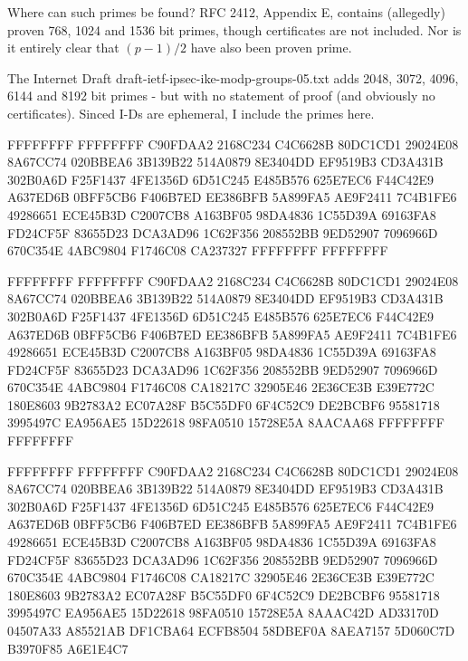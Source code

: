 \documentclass[a4paper,titlepage]{article}
\begin{document}
Where can such primes be found? RFC 2412, Appendix E, contains
(allegedly) proven 768, 1024 and 1536 bit primes, though certificates
are not included. Nor is it entirely clear that $(p-1)/2$ have also
been proven prime.

The Internet Draft draft-ietf-ipsec-ike-modp-groups-05.txt adds 2048,
3072, 4096, 6144 and 8192 bit primes - but with no statement of proof
(and obviously no certificates). Sinced I-Ds are ephemeral, I include
the primes here.


\begin{tt}
	FFFFFFFF FFFFFFFF C90FDAA2 2168C234 C4C6628B 80DC1CD1
	29024E08 8A67CC74 020BBEA6 3B139B22 514A0879 8E3404DD
	EF9519B3 CD3A431B 302B0A6D F25F1437 4FE1356D 6D51C245
	E485B576 625E7EC6 F44C42E9 A637ED6B 0BFF5CB6 F406B7ED
	EE386BFB 5A899FA5 AE9F2411 7C4B1FE6 49286651 ECE45B3D
	C2007CB8 A163BF05 98DA4836 1C55D39A 69163FA8 FD24CF5F
	83655D23 DCA3AD96 1C62F356 208552BB 9ED52907 7096966D
	670C354E 4ABC9804 F1746C08 CA237327 FFFFFFFF FFFFFFFF
\end{tt}


\begin{tt}
        FFFFFFFF FFFFFFFF C90FDAA2 2168C234 C4C6628B 80DC1CD1
        29024E08 8A67CC74 020BBEA6 3B139B22 514A0879 8E3404DD
        EF9519B3 CD3A431B 302B0A6D F25F1437 4FE1356D 6D51C245
        E485B576 625E7EC6 F44C42E9 A637ED6B 0BFF5CB6 F406B7ED
        EE386BFB 5A899FA5 AE9F2411 7C4B1FE6 49286651 ECE45B3D
        C2007CB8 A163BF05 98DA4836 1C55D39A 69163FA8 FD24CF5F
        83655D23 DCA3AD96 1C62F356 208552BB 9ED52907 7096966D
        670C354E 4ABC9804 F1746C08 CA18217C 32905E46 2E36CE3B
        E39E772C 180E8603 9B2783A2 EC07A28F B5C55DF0 6F4C52C9
        DE2BCBF6 95581718 3995497C EA956AE5 15D22618 98FA0510
        15728E5A 8AACAA68 FFFFFFFF FFFFFFFF
\end{tt}


\begin{tt}
        FFFFFFFF FFFFFFFF C90FDAA2 2168C234 C4C6628B 80DC1CD1
        29024E08 8A67CC74 020BBEA6 3B139B22 514A0879 8E3404DD
        EF9519B3 CD3A431B 302B0A6D F25F1437 4FE1356D 6D51C245
        E485B576 625E7EC6 F44C42E9 A637ED6B 0BFF5CB6 F406B7ED
        EE386BFB 5A899FA5 AE9F2411 7C4B1FE6 49286651 ECE45B3D
        C2007CB8 A163BF05 98DA4836 1C55D39A 69163FA8 FD24CF5F
        83655D23 DCA3AD96 1C62F356 208552BB 9ED52907 7096966D
        670C354E 4ABC9804 F1746C08 CA18217C 32905E46 2E36CE3B
        E39E772C 180E8603 9B2783A2 EC07A28F B5C55DF0 6F4C52C9
        DE2BCBF6 95581718 3995497C EA956AE5 15D22618 98FA0510
        15728E5A 8AAAC42D AD33170D 04507A33 A85521AB DF1CBA64
        ECFB8504 58DBEF0A 8AEA7157 5D060C7D B3970F85 A6E1E4C7
\end{tt}
\end{document}
